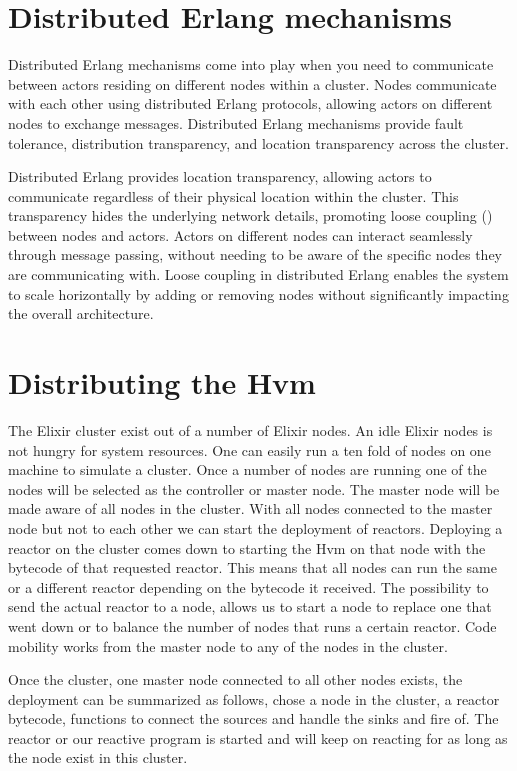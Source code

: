 \documentclass[a4paper]{book}
\begin{document}
\section{Distributed Erlang mechanisms}
Distributed Erlang mechanisms come into play when you need to communicate between actors residing on different nodes within a cluster.
Nodes communicate with each other using distributed Erlang protocols, allowing actors on different nodes to exchange messages. Distributed Erlang mechanisms provide fault tolerance, distribution transparency, and location transparency across the cluster. 

Distributed Erlang provides location transparency, allowing actors to communicate regardless of their physical location within the cluster. This transparency hides the underlying network details, promoting loose coupling (\cite{DBLP:conf/tools/CarretonMCM10}) between nodes and actors. Actors on different nodes can interact seamlessly through message passing, without needing to be aware of the specific nodes they are communicating with. Loose coupling in distributed Erlang enables the system to scale horizontally by adding or removing nodes without significantly impacting the overall architecture.

\section{Distributing the Hvm}
The Elixir cluster exist out of a number of Elixir nodes. An idle Elixir nodes is not hungry for system resources. One can easily run a ten fold of nodes on one machine to simulate a cluster. Once a number of nodes are running one of the nodes will be selected as the controller or master node. The master node will be made aware of all nodes in the cluster. With all nodes connected to the master node but not to each other we can start the deployment of reactors. Deploying a reactor on the cluster comes down to starting the Hvm on that node with the bytecode of that requested reactor. This means that all nodes can run the same or a different reactor depending on the bytecode it received. The possibility to send the actual reactor to a node, allows us to start a node to replace one that went down or to balance the number of nodes that runs a certain reactor. Code mobility works from the master node to any of the nodes in the cluster. 

Once the cluster, one master node connected to all other nodes exists, the deployment can be summarized as follows, chose a node in the cluster, a reactor bytecode, functions to connect the sources and handle the sinks and fire of. The reactor or our reactive program is started and will keep on reacting for as long as the node exist in this cluster. 
\end{document}
